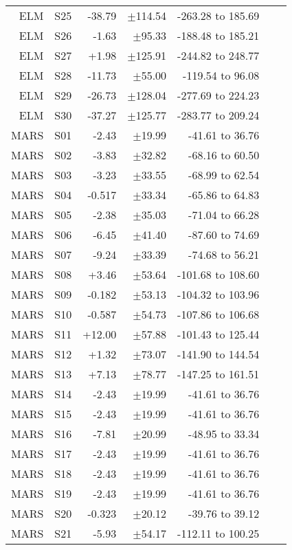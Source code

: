 \begin{table}
\begin{tabular}{rrrrrrr}
  ELM &  S25 & -38.79 & $\pm$114.54 & -263.28 to 185.69 \\
  ELM &  S26 &  -1.63 &  $\pm$95.33 & -188.48 to 185.21 \\
  ELM &  S27 &  +1.98 & $\pm$125.91 & -244.82 to 248.77 \\
  ELM &  S28 & -11.73 &  $\pm$55.00 &  -119.54 to 96.08 \\
  ELM &  S29 & -26.73 & $\pm$128.04 & -277.69 to 224.23 \\
  ELM &  S30 & -37.27 & $\pm$125.77 & -283.77 to 209.24 \\
 MARS &  S01 &  -2.43 &  $\pm$19.99 &   -41.61 to 36.76 \\
 MARS &  S02 &  -3.83 &  $\pm$32.82 &   -68.16 to 60.50 \\
 MARS &  S03 &  -3.23 &  $\pm$33.55 &   -68.99 to 62.54 \\
 MARS &  S04 & -0.517 &  $\pm$33.34 &   -65.86 to 64.83 \\
 MARS &  S05 &  -2.38 &  $\pm$35.03 &   -71.04 to 66.28 \\
 MARS &  S06 &  -6.45 &  $\pm$41.40 &   -87.60 to 74.69 \\
 MARS &  S07 &  -9.24 &  $\pm$33.39 &   -74.68 to 56.21 \\
 MARS &  S08 &  +3.46 &  $\pm$53.64 & -101.68 to 108.60 \\
 MARS &  S09 & -0.182 &  $\pm$53.13 & -104.32 to 103.96 \\
 MARS &  S10 & -0.587 &  $\pm$54.73 & -107.86 to 106.68 \\
 MARS &  S11 & +12.00 &  $\pm$57.88 & -101.43 to 125.44 \\
 MARS &  S12 &  +1.32 &  $\pm$73.07 & -141.90 to 144.54 \\
 MARS &  S13 &  +7.13 &  $\pm$78.77 & -147.25 to 161.51 \\
 MARS &  S14 &  -2.43 &  $\pm$19.99 &   -41.61 to 36.76 \\
 MARS &  S15 &  -2.43 &  $\pm$19.99 &   -41.61 to 36.76 \\
 MARS &  S16 &  -7.81 &  $\pm$20.99 &   -48.95 to 33.34 \\
 MARS &  S17 &  -2.43 &  $\pm$19.99 &   -41.61 to 36.76 \\
 MARS &  S18 &  -2.43 &  $\pm$19.99 &   -41.61 to 36.76 \\
 MARS &  S19 &  -2.43 &  $\pm$19.99 &   -41.61 to 36.76 \\
 MARS &  S20 & -0.323 &  $\pm$20.12 &   -39.76 to 39.12 \\
 MARS &  S21 &  -5.93 &  $\pm$54.17 & -112.11 to 100.25 \\

\end{tabular}
\end{table}
